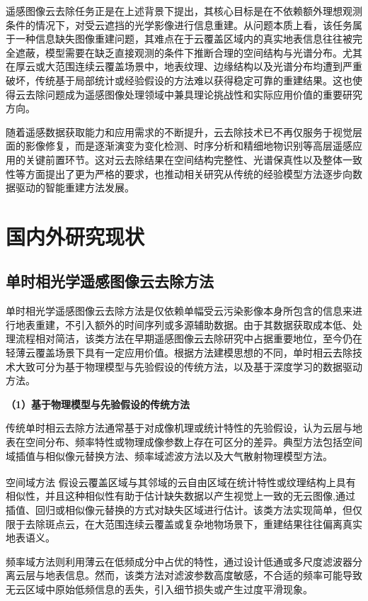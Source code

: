 遥感图像云去除任务正是在上述背景下提出，其核心目标是在不依赖额外理想观测条件的情况下，对受云遮挡的光学影像进行信息重建。从问题本质上看，该任务属于一种信息缺失图像重建问题，其难点在于云覆盖区域内的真实地表信息往往被完全遮蔽，模型需要在缺乏直接观测的条件下推断合理的空间结构与光谱分布。尤其在厚云或大范围连续云覆盖场景中，地表纹理、边缘结构以及光谱分布均遭到严重破坏，传统基于局部统计或经验假设的方法难以获得稳定可靠的重建结果。这也使得云去除问题成为遥感图像处理领域中兼具理论挑战性和实际应用价值的重要研究方向。

随着遥感数据获取能力和应用需求的不断提升，云去除技术已不再仅服务于视觉层面的影像修复，而是逐渐演变为变化检测、时序分析和精细地物识别等高层遥感应用的关键前置环节。这对云去除结果在空间结构完整性、光谱保真性以及整体一致性等方面提出了更为严格的要求，也推动相关研究从传统的经验模型方法逐步向数据驱动的智能重建方法发展。

\section{国内外研究现状}

\subsection{单时相光学遥感图像云去除方法}

单时相光学遥感图像云去除方法是仅依赖单幅受云污染影像本身所包含的信息来进行地表重建，不引入额外的时间序列或多源辅助数据。由于其数据获取成本低、处理流程相对简洁，该类方法在早期遥感图像云去除研究中占据重要地位，至今仍在轻薄云覆盖场景下具有一定应用价值。根据方法建模思想的不同，单时相云去除技术大致可分为基于物理模型与先验假设的传统方法，以及基于深度学习的数据驱动方法。

\textbf{（1）基于物理模型与先验假设的传统方法}

传统单时相云去除方法通常基于对成像机理或统计特性的先验假设，认为云层与地表在空间分布、频率特性或物理成像参数上存在可区分的差异。典型方法包括空间域插值与相似像元替换方法、频率域滤波方法以及大气散射物理模型方法。

空间域方法 \textsuperscript{\cite{zhu2011modified,xu2019thin}}假设云覆盖区域与其邻域的云自由区域在统计特性或纹理结构上具有相似性，并且这种相似性有助于估计缺失数据以产生视觉上一致的无云图像,通过插值、回归或相似像元替换的方式对缺失区域进行估计。该类方法实现简单，但仅限于去除斑点云，在大范围连续云覆盖或复杂地物场景下，重建结果往往偏离真实地表语义。

频率域方法则利用薄云在低频成分中占优的特性，通过设计低通或多尺度滤波器分离云层与地表信息。然而，该类方法对滤波参数高度敏感，不合适的频率可能导致无云区域中原始低频信息的丢失，引入细节损失或产生过度平滑现象。

